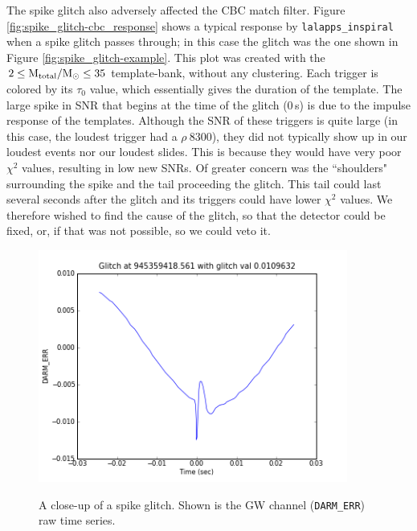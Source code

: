 The spike glitch also adversely affected the \ac{CBC} match filter. Figure
\ref{fig:spike_glitch-cbc_response} shows a typical response by
\verb|lalapps_inspiral| when a spike glitch passes through; in this case the
glitch was the one shown in Figure \ref{fig:spike_glitch-example}. This plot
was created with the $2 \leq \mathrm{M_{total}}/\mathrm{M_\odot} \leq 35$ template-bank, without any
clustering. Each trigger is colored by its $\tau_0$ value, which essentially
gives the duration of the template. The large spike in \ac{SNR} that begins at
the time of the glitch ($0\,$s) is due to the impulse response of the
templates. Although the \ac{SNR} of these triggers is quite large (in this
case, the loudest trigger had a $\rho ~ 8300$), they did not typically show up
in our loudest events nor our loudest slides. This is because they would have
very poor $\chi^2$ values, resulting in low new \acp{SNR}. Of greater concern
was the ``shoulders" surrounding the spike and the tail proceeding the glitch.
This tail could last several seconds after the glitch and its triggers could
have lower $\chi^2$ values. We therefore wished to find the cause of the
glitch, so that the detector could be fixed, or, if that was not possible, so
we could veto it.

\begin{figure}[htb]
\center
\includegraphics[width=4in]{figures/spike_glitch/spike_glitch_example.png}
\label{fig:spike_glitch-closeup}
\caption{A close-up of a spike glitch. Shown is the \ac{GW} channel (\texttt{DARM\_ERR}) raw time series.}
\end{figure}

